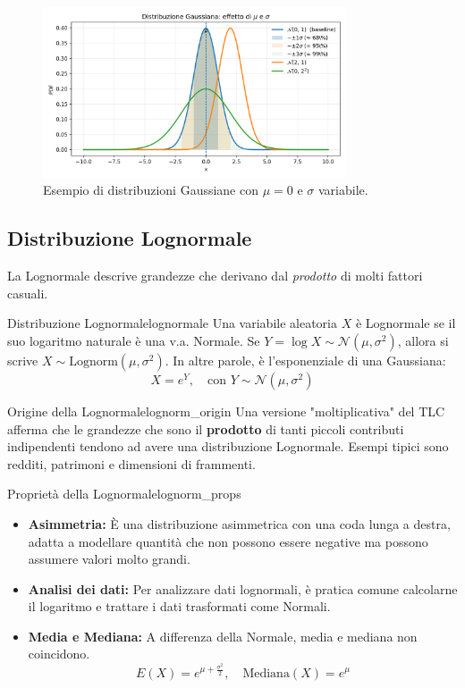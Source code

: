 \begin{figure}[H]
    \centering
    \includegraphics[width=0.8\textwidth]{images/gaussiana.png}
    \caption{Esempio di distribuzioni Gaussiane con \(\mu=0\) e \(\sigma\) variabile.}
    \label{fig:gaussiana}
\end{figure}

\subsection{Distribuzione Lognormale}
La Lognormale descrive grandezze che derivano dal \emph{prodotto} di molti fattori casuali.

\begin{definizione}{Distribuzione Lognormale}{lognormale}
Una variabile aleatoria \(X\) è Lognormale se il suo logaritmo naturale è una v.a. Normale. Se \(Y = \log X \sim \mathcal{N}(\mu, \sigma^2)\), allora si scrive \(X \sim \text{Lognorm}(\mu, \sigma^2)\). In altre parole, è l'esponenziale di una Gaussiana:
\[ X = e^Y, \quad \text{con } Y \sim \mathcal{N}(\mu, \sigma^2) \]
\end{definizione}

\begin{nota}{Origine della Lognormale}{lognorm_origin}
Una versione "moltiplicativa" del TLC afferma che le grandezze che sono il \textbf{prodotto} di tanti piccoli contributi indipendenti tendono ad avere una distribuzione Lognormale. Esempi tipici sono redditi, patrimoni e dimensioni di frammenti.
\end{nota}

\begin{proposizione}{Proprietà della Lognormale}{lognorm_props}
\begin{itemize}
    \item \textbf{Asimmetria:} È una distribuzione asimmetrica con una coda lunga a destra, adatta a modellare quantità che non possono essere negative ma possono assumere valori molto grandi.
    \item \textbf{Analisi dei dati:} Per analizzare dati lognormali, è pratica comune calcolarne il logaritmo e trattare i dati trasformati come Normali.
    \item \textbf{Media e Mediana:} A differenza della Normale, media e mediana non coincidono.
    \[ E(X) = e^{\mu + \frac{\sigma^2}{2}}, \quad \text{Mediana}(X) = e^\mu \]
\end{itemize}
\end{proposizione}

